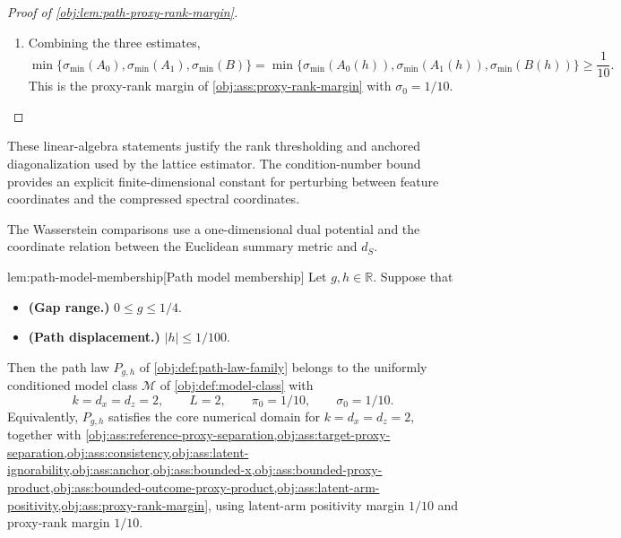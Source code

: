 \documentclass[11pt]{article}
\begin{document}
\begin{proof}[Proof of \cref{obj:lem:path-proxy-rank-margin}]
\begin{enumerate}
\item Combining the three estimates,
\[
\min\{\sigma_{\min}(A_0),\sigma_{\min}(A_1),\sigma_{\min}(B)\}
=
\min\{\sigma_{\min}(A_0(h)),\sigma_{\min}(A_1(h)),\sigma_{\min}(B(h))\}
\ge \frac1{10}.
\]
This is the proxy-rank margin of \cref{obj:ass:proxy-rank-margin} with \(\sigma_0=1/10\). %
\end{enumerate}
\end{proof}

These linear-algebra statements justify the rank thresholding and anchored diagonalization used by the lattice estimator. The condition-number bound provides an explicit finite-dimensional constant for perturbing between feature coordinates and the compressed spectral coordinates.

The Wasserstein comparisons use a one-dimensional dual potential and the coordinate relation between the Euclidean summary metric and \(d_S\).

\begin{lemmav}{lem:path-model-membership}[Path model membership]
Let \(g,h\in\mathbb R\). Suppose that
\begin{itemize}
\item \textbf{(Gap range.)} \(0\le g\le 1/4\).
\item \textbf{(Path displacement.)} \(|h|\le 1/100\).
\end{itemize}
Then the path law \(P_{g,h}\) of \cref{obj:def:path-law-family} belongs to the uniformly conditioned model class \(\mathcal M\) of \cref{obj:def:model-class} with
\[
k=d_x=d_z=2,\qquad L=2,\qquad \pi_0=1/10,\qquad \sigma_0=1/10 .
\]
Equivalently, \(P_{g,h}\) satisfies the core numerical domain for \(k=d_x=d_z=2\), together with \cref{obj:ass:reference-proxy-separation,obj:ass:target-proxy-separation,obj:ass:consistency,obj:ass:latent-ignorability,obj:ass:anchor,obj:ass:bounded-x,obj:ass:bounded-proxy-product,obj:ass:bounded-outcome-proxy-product,obj:ass:latent-arm-positivity,obj:ass:proxy-rank-margin}, using latent-arm positivity margin \(1/10\) and proxy-rank margin \(1/10\).
\end{lemmav}
\end{document}
